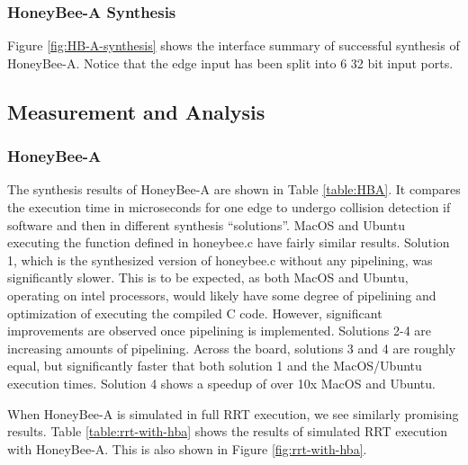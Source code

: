         \subsubsection*{HoneyBee-A Synthesis}
        Figure \ref{fig:HB-A-synthesis} shows the interface summary of successful synthesis of HoneyBee-A. Notice that the edge input has been split into 6 32 bit input ports. 
        
    
    \subsection{Measurement and Analysis}
        \subsubsection*{HoneyBee-A}
            The synthesis results of HoneyBee-A are shown in Table \ref{table:HBA}. It compares the execution time in microseconds for one edge to undergo collision detection if software and then in different synthesis ``solutions''. MacOS and Ubuntu executing the function defined in honeybee.c have fairly similar results. Solution 1, which is the synthesized version of honeybee.c without any pipelining, was significantly slower. This is to be expected, as both MacOS and Ubuntu, operating on intel processors, would likely have some degree of pipelining and optimization of executing the compiled C code. However, significant improvements are observed once pipelining is implemented. Solutions 2-4 are increasing amounts of pipelining. Across the board, solutions 3 and 4 are roughly equal, but significantly faster that both solution 1 and the MacOS/Ubuntu execution times. Solution 4 shows a speedup of over 10x MacOS and Ubuntu.
            

            When HoneyBee-A is simulated in full \gls{RRT} execution, we see similarly promising results. Table \ref{table:rrt-with-hba} shows the results of simulated RRT execution with HoneyBee-A. This is also shown in Figure \ref{fig:rrt-with-hba}.
            
            

